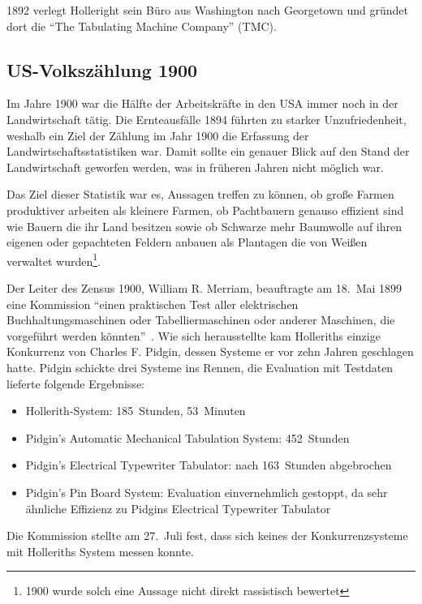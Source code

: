 \documentclass[parskip=half]{scrartcl}
\begin{document}
1892 verlegt Holleright sein Büro aus Washington nach Georgetown und gründet
dort die \enquote{The Tabulating Machine Company} (TMC).

\subsection{US-Volkszählung 1900}
\label{sec:1900}

Im Jahre 1900 war die Hälfte der Arbeitskräfte in den USA immer noch in der
Landwirtschaft tätig. Die Ernteausfälle 1894 führten zu starker
Unzufriedenheit, weshalb ein Ziel der Zählung im Jahr 1900 die Erfassung der
Landwirtschaftsstatistiken war. Damit sollte ein genauer Blick auf den Stand der
Landwirtschaft geworfen werden, was in früheren Jahren nicht möglich war.

Das Ziel dieser Statistik war es, Aussagen treffen zu können, ob große Farmen
produktiver arbeiten als kleinere Farmen, ob Pachtbauern genauso effizient sind wie
Bauern die ihr Land besitzen sowie ob Schwarze mehr Baumwolle auf ihren eigenen
oder gepachteten Feldern anbauen als Plantagen die von Weißen verwaltet
wurden\footnote{1900 wurde solch eine Aussage nicht direkt rassistisch
bewertet}.

Der Leiter des Zensus 1900, William R. Merriam, beauftragte am 18.~Mai 1899
eine Kommission \enquote{einen praktischen Test aller elektrischen
Buchhaltungsmaschinen oder Tabelliermaschinen oder anderer Maschinen, die
vorgeführt werden könnten}~\cite{austrian1982herman}. Wie sich herausstellte
kam Holleriths einzige Konkurrenz von Charles F. Pidgin, dessen Systeme er vor
zehn Jahren geschlagen hatte. Pidgin schickte drei Systeme ins Rennen, die
Evaluation mit Testdaten lieferte folgende Ergebnisse:

\begin{itemize}
  \item Hollerith-System: 185~Stunden, 53~Minuten
  \item Pidgin's Automatic Mechanical Tabulation System: 452~Stunden
  \item Pidgin's Electrical Typewriter Tabulator: nach 163~Stunden abgebrochen
  \item Pidgin's Pin Board System: Evaluation einvernehmlich gestoppt, da sehr
    ähnliche Effizienz zu Pidgins Electrical Typewriter Tabulator
\end{itemize}

Die Kommission stellte am 27.~Juli fest, dass sich keines der Konkurrenzsysteme
mit Holleriths System messen konnte.
\end{document}
